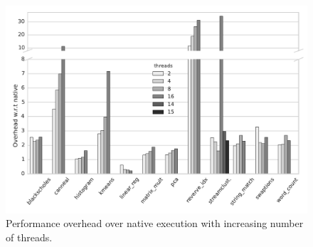 
\begin{figure}[t]
\centering
\includegraphics[scale=0.4]{figure/benchmarks/times-xy.pdf}
\caption{Performance overhead  over native execution with increasing number of threads.}
\label{fig:overheads}
\end{figure}
